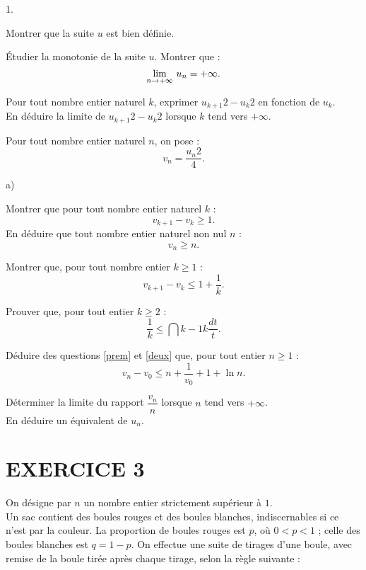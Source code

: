 \documentclass[11pt]{article}%
\begin{document}
\begin{noliste}{1.}
 \setlength{\itemsep}{4mm}
\item Montrer que la suite $u$ est bien définie.

\item Étudier la monotonie de la suite $u$. Montrer que : 
\[
{\displaystyle \lim_{n\rightarrow + \infty} \ } u_{n} = + \infty.
\]

\item Pour tout nombre entier naturel $k$, exprimer $u_{k +
1}{2}-u_{k}{2}$
en fonction de $u_{k}$. \\
En déduire la limite de $u_{k + 1}{2}-u_{k}{2}$ lorsque $k$ tend vers $
+ \infty $.

\item Pour tout nombre entier naturel $n$, on pose : 
\[
v_{n} = \frac{u_{n}{2}}{4}.
\]

\begin{noliste}{a)}
 \setlength{\itemsep}{2mm}
\item Montrer que pour tout nombre entier naturel $k$ : 
\[
v_{k + 1}-v_{k}\geq 1.
\]
En déduire que tout nombre entier naturel non nul $n$ : 
\[
v_{n}\geq n.
\]

\item \label{prem} Montrer que, pour tout nombre entier $k\geq 1$ : 
\[
v_{k + 1}-v_{k}\leq 1 + \frac{1}{k}.
\]

\item \label{deux} Prouver que, pour tout entier $k\geq 2$ : 
\[
\frac{1}{k}\leq \dint{k-1}{k}\frac{dt}{t}.
\]

\item Déduire des questions \ref{prem} et \ref{deux} que, pour tout
entier $n\geq 1$ : 
\[
v_{n}-v_{0}\leq n + \frac{1}{v_{0}} + 1 + \ln n.
\]
\end{noliste}

\item Déterminer la limite du rapport $\dfrac{v_{n}}{n}$ lorsque $n$
tend
vers $ + \infty $. \\
En déduire un équivalent de $u_{n}$.
\end{noliste}

\section*{EXERCICE 3}

On désigne par $n$ un nombre entier strictement supérieur à $1$.\\
Un sac contient des boules rouges et des boules blanches,
indiscernables si
ce n'est par la couleur. La proportion de boules rouges est $p$, où
$0<p<1$
; celle des boules blanches est $q = 1-p$. On effectue une suite de
tirages
d'une boule, avec remise de la boule tirée après chaque tirage, selon
la règle suivante :
\end{document}

